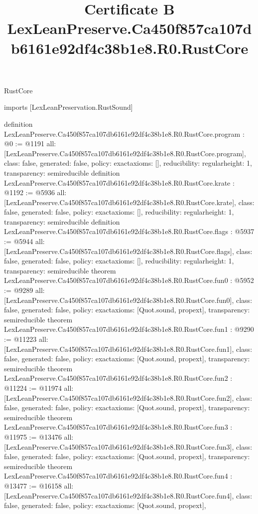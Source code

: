 \begin{lexlean}{RustCore}
\title{Certificate B LexLeanPreserve.Ca450f857ca107db6161e92df4c38b1e8.R0.RustCore}
\begin{coremodule}
imports [LexLeanPreservation.RustSound]

definition LexLeanPreserve.Ca450f857ca107db6161e92df4c38b1e8.R0.RustCore.program : @0 := @1191 {
  all: [LexLeanPreserve.Ca450f857ca107db6161e92df4c38b1e8.R0.RustCore.program],
  class: false,
  generated: false,
  policy: exact{axioms: []},
  reducibility: regular{height: 1},
  transparency: semireducible
}
definition LexLeanPreserve.Ca450f857ca107db6161e92df4c38b1e8.R0.RustCore.krate : @1192 := @5936 {
  all: [LexLeanPreserve.Ca450f857ca107db6161e92df4c38b1e8.R0.RustCore.krate],
  class: false,
  generated: false,
  policy: exact{axioms: []},
  reducibility: regular{height: 1},
  transparency: semireducible
}
definition LexLeanPreserve.Ca450f857ca107db6161e92df4c38b1e8.R0.RustCore.flags : @5937 := @5944 {
  all: [LexLeanPreserve.Ca450f857ca107db6161e92df4c38b1e8.R0.RustCore.flags],
  class: false,
  generated: false,
  policy: exact{axioms: []},
  reducibility: regular{height: 1},
  transparency: semireducible
}
theorem LexLeanPreserve.Ca450f857ca107db6161e92df4c38b1e8.R0.RustCore.fun0 : @5952 := @9289 {
  all: [LexLeanPreserve.Ca450f857ca107db6161e92df4c38b1e8.R0.RustCore.fun0],
  class: false,
  generated: false,
  policy: exact{axioms: [Quot.sound, propext]},
  transparency: semireducible
}
theorem LexLeanPreserve.Ca450f857ca107db6161e92df4c38b1e8.R0.RustCore.fun1 : @9290 := @11223 {
  all: [LexLeanPreserve.Ca450f857ca107db6161e92df4c38b1e8.R0.RustCore.fun1],
  class: false,
  generated: false,
  policy: exact{axioms: [Quot.sound, propext]},
  transparency: semireducible
}
theorem LexLeanPreserve.Ca450f857ca107db6161e92df4c38b1e8.R0.RustCore.fun2 : @11224 := @11974 {
  all: [LexLeanPreserve.Ca450f857ca107db6161e92df4c38b1e8.R0.RustCore.fun2],
  class: false,
  generated: false,
  policy: exact{axioms: [Quot.sound, propext]},
  transparency: semireducible
}
theorem LexLeanPreserve.Ca450f857ca107db6161e92df4c38b1e8.R0.RustCore.fun3 : @11975 := @13476 {
  all: [LexLeanPreserve.Ca450f857ca107db6161e92df4c38b1e8.R0.RustCore.fun3],
  class: false,
  generated: false,
  policy: exact{axioms: [Quot.sound, propext]},
  transparency: semireducible
}
theorem LexLeanPreserve.Ca450f857ca107db6161e92df4c38b1e8.R0.RustCore.fun4 : @13477 := @16158 {
  all: [LexLeanPreserve.Ca450f857ca107db6161e92df4c38b1e8.R0.RustCore.fun4],
  class: false,
  generated: false,
  policy: exact{axioms: [Quot.sound, propext]},
}
\end{coremodule}
\end{lexlean}
